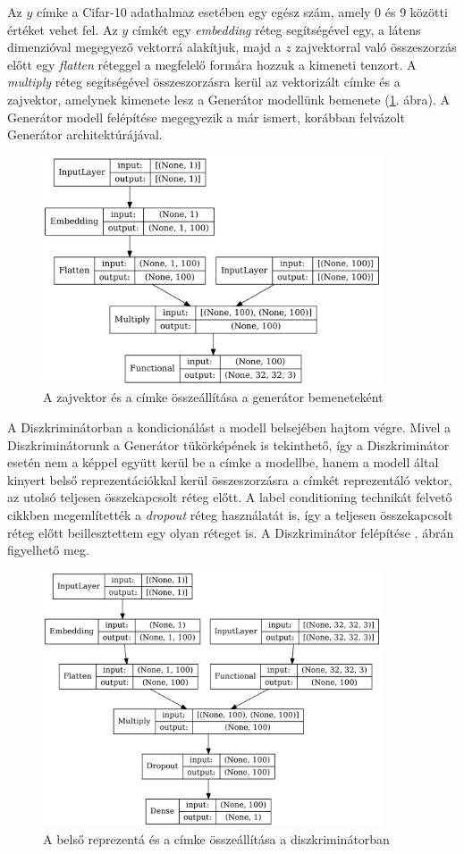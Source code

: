 Az $y$ címke a Cifar-10 adathalmaz esetében egy egész szám, amely 0 és 9 közötti értéket vehet fel. Az $y$ címkét egy \textit{embedding} réteg segítségével egy, a látens dimenzióval megegyező vektorrá alakítjuk, majd a $z$ zajvektorral való összeszorzás előtt egy \textit{flatten} réteggel a megfelelő formára hozzuk a kimeneti tenzort.
A \textit{multiply} réteg segítségével összeszorzásra kerül az vektorizált címke és a zajvektor, amelynek kimenete lesz a Generátor modellünk bemenete (\ref{fig:labelnoiseembedding}. ábra). A Generátor modell felépítése megegyezik a már ismert, korábban felvázolt Generátor architektúrájával.

\begin{figure}[h]
	\centering
	\includegraphics[width=10cm]{images/label_noise_embedding.png}
	\caption{A zajvektor és a címke összeállítása a generátor bemeneteként}
	\label{fig:labelnoiseembedding}
\end{figure}

A Diszkriminátorban a kondicionálást a modell belsejében hajtom végre. Mivel a Diszkriminátorunk a Generátor tükörképének is tekinthető, így a Diszkriminátor esetén nem a képpel együtt kerül be a címke a modellbe, hanem a modell által kinyert belső reprezentációkkal kerül összeszorzásra a címkét reprezentáló vektor, az utolsó teljesen összekapcsolt réteg előtt. A label conditioning technikát felvető cikkben megemlítették a \textit{dropout} réteg használatát is, így a teljesen összekapcsolt réteg előtt beillesztettem egy olyan réteget is.
A Diszkriminátor felépítése . ábrán figyelhető meg.

\begin{figure}[h]
	\centering
	\includegraphics[width=10cm]{images/label_discriminator.png}
	\caption{A belső reprezentá és a címke összeállítása a diszkriminátorban}
	\label{fig:labeldiscriminator}
\end{figure}

